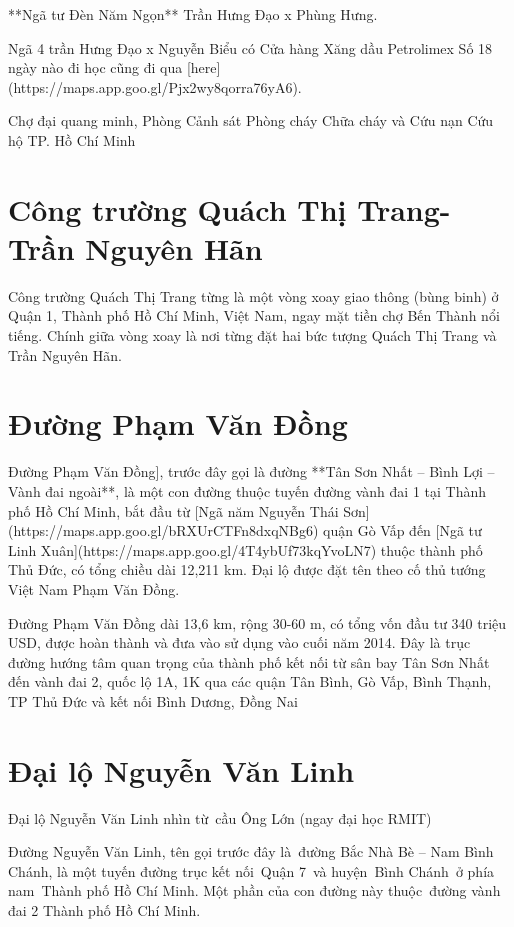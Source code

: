 **Ngã tư Đèn Năm Ngọn** Trần Hưng Đạo x Phùng Hưng.

Ngã 4 trần Hưng Đạo x Nguyễn Biểu có Cửa hàng Xăng dầu Petrolimex Số 18 ngày nào đi học cũng đi qua [here](https://maps.app.goo.gl/Pjx2wy8qorra76yA6).

Chợ đại quang minh, Phòng Cảnh sát Phòng cháy Chữa cháy và Cứu nạn Cứu hộ TP. Hồ Chí Minh

\section{Công trường Quách Thị Trang-Trần Nguyên Hãn}

Công trường Quách Thị Trang từng là một vòng xoay giao thông (bùng binh) ở Quận 1, Thành phố Hồ Chí Minh, Việt Nam, ngay mặt tiền chợ Bến Thành nổi tiếng. Chính giữa vòng xoay là nơi từng đặt hai bức tượng Quách Thị Trang và Trần Nguyên Hãn.

\section{Đường Phạm Văn Đồng}

Đường Phạm Văn Đồng], trước đây gọi là đường **Tân Sơn Nhất – Bình Lợi – Vành đai ngoài**, là một con đường thuộc tuyến đường vành đai 1 tại Thành phố Hồ Chí Minh, bắt đầu từ [Ngã năm Nguyễn Thái Sơn](https://maps.app.goo.gl/bRXUrCTFn8dxqNBg6) quận Gò Vấp đến [Ngã tư Linh Xuân](https://maps.app.goo.gl/4T4ybUf73kqYvoLN7) thuộc thành phố Thủ Đức, có tổng chiều dài 12,211 km. Đại lộ được đặt tên theo cố thủ tướng Việt Nam Phạm Văn Đồng.

Đường Phạm Văn Đồng dài 13,6 km, rộng 30-60 m, có tổng vốn đầu tư 340 triệu USD, được hoàn thành và đưa vào sử dụng vào cuối năm 2014. Đây là trục đường hướng tâm quan trọng của thành phố kết nối từ sân bay Tân Sơn Nhất đến vành đai 2, quốc lộ 1A, 1K qua các quận Tân Bình, Gò Vấp, Bình Thạnh, TP Thủ Đức và kết nối Bình Dương, Đồng Nai

\section{Đại lộ Nguyễn Văn Linh}

Đại lộ Nguyễn Văn Linh nhìn từ cầu Ông Lớn (ngay đại học RMIT)

Đường Nguyễn Văn Linh, tên gọi trước đây là đường Bắc Nhà Bè – Nam Bình Chánh, là một tuyến đường trục kết nối Quận 7 và huyện Bình Chánh ở phía nam Thành phố Hồ Chí Minh. Một phần của con đường này thuộc đường vành đai 2 Thành phố Hồ Chí Minh.


